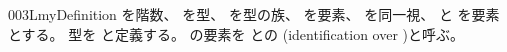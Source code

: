 \documentclass[index]{subfiles}
\begin{document}
\begin{myBlock}{003L}{myDefinition}
  を階数、
  を型、
  を型の族、
  を要素、
  を同一視、
  と
  を要素とする。
  型を
  と定義する。
  の要素を
  との
  (identification over )と呼ぶ。
\end{myBlock}
\end{document}
